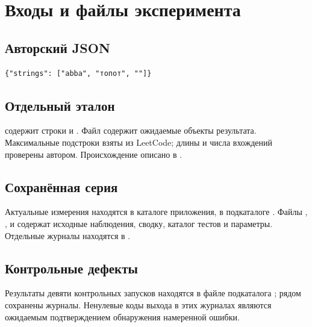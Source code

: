 \chapter{Входы и файлы эксперимента}\label{appendix-data}
\section*{Авторский JSON}
\begin{Verbatim}[fontsize=\small,frame=single]
{"strings": ["abba", "топот", ""]}
\end{Verbatim}
\section*{Отдельный эталон}
 содержит строки  и . Файл  содержит ожидаемые объекты результата. Максимальные подстроки взяты из LeetCode; длины и числа вхождений проверены автором. Происхождение описано в .
\section*{Сохранённая серия}
Актуальные измерения находятся в каталоге  приложения, в подкаталоге . Файлы , ,  и  содержат исходные наблюдения, сводку, каталог тестов и параметры. Отдельные журналы находятся в .
\section*{Контрольные дефекты}
Результаты девяти контрольных запусков находятся в файле  подкаталога ; рядом сохранены журналы. Ненулевые коды выхода в этих журналах являются ожидаемым подтверждением обнаружения намеренной ошибки.

